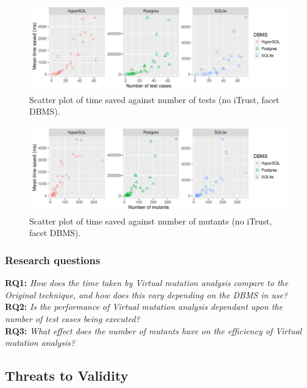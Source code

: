 		\begin{figure}[t]
			\centering
			\includegraphics[width=6in]{graphics/time_saved_vs_tests_scatter_noitrust_facetdbms.pdf}
			\caption{Scatter plot of time saved against number of tests (no iTrust, facet DBMS). }
		\end{figure}

		\begin{figure}[t]
			\centering
			\includegraphics[width=6in]{graphics/time_saved_vs_mutants_scatter_noitrust_facetdbms.pdf}
			\caption{Scatter plot of time saved against number of mutants (no iTrust, facet DBMS). }
		\end{figure}

		\subsubsection{Research questions}

			\textbf{RQ1: }\emph{How does the time taken by Virtual mutation analysis compare to the Original technique, and how does this vary depending on the DBMS in use?}\\


			\textbf{RQ2: }\emph{Is the performance of Virtual mutation analysis dependant upon the number of test cases being executed?}\\


			\textbf{RQ3: }\emph{What effect does the number of mutants have on the efficiency of Virtual mutation analysis?}\\


		

	\subsection{Threats to Validity}
